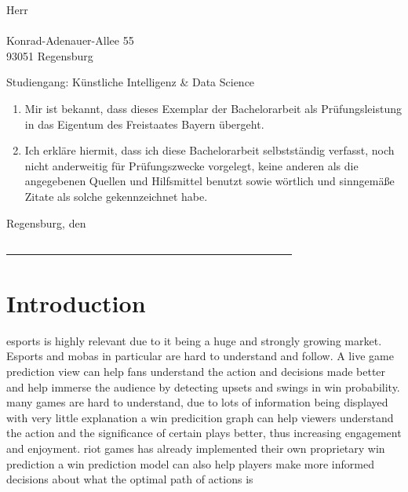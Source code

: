 \documentclass[12pt, a4paper, headinclude, twoside, plainheadsepline, open=right, numbers=noenddot, hidelinks, toc=listof, toc=bibliography]{scrreprt}
\begin{document}
\noindent
Herr\\
\@author\\
Konrad-Adenauer-Allee 55\\
93051 Regensburg\\
\smallskip

\noindent
Studiengang: Künstliche Intelligenz \& Data Science
\bigskip

\begin{enumerate}
\item Mir ist bekannt, dass dieses Exemplar der Bachelorarbeit als Prüfungsleistung in das Eigentum des Freistaates Bayern übergeht.
\item Ich erkläre hiermit, dass ich diese Bachelorarbeit selbstständig verfasst, noch nicht anderweitig für Prüfungszwecke vorgelegt, keine anderen als die angegebenen Quellen und Hilfsmittel benutzt sowie wörtlich und sinngemäße Zitate als solche gekennzeichnet habe.
\end{enumerate}
\vspace{1cm}
Regensburg, den \@date\\
\medskip
\medskip

\noindent
\underline{~~~~~~~~~~~~~~~~~~~~~~~~~~~~~~~~~~~~~~~~~~~~~~~~~~~~}\\
\@author

\makeatother




\cleardoublepage
{}\tableofcontents 										%




\pagestyle{scrheadings} 																%
\cleardoublepage
{} 																	%


\chapter{Introduction}
\label{chap:intro}


esports is highly relevant due to it being a huge and strongly growing market.
Esports and mobas in particular are hard to understand and follow. A live game prediction view can help fans understand the action and decisions made better and help immerse the audience by detecting upsets and swings in win probability.
many games are hard to understand, due to lots of information being displayed with very little explanation
a win predicition graph can help viewers understand the action and the significance of certain plays better, thus increasing engagement and enjoyment.
riot games has already implemented their own proprietary win prediction
a win prediction model can also help players make more informed decisions about what the optimal path of actions is
\end{document}
